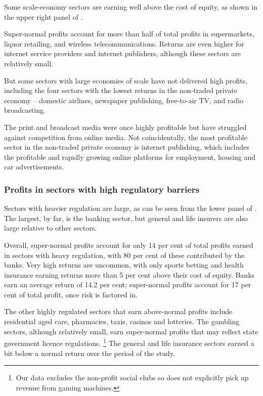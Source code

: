 Some scale-economy sectors are earning well above the cost of equity, as shown in the upper right panel of .

Super-normal profits account for more than half of total profits in supermarkets, liquor retailing, and wireless telecommunications. Returns are even higher for internet service providers and internet publishers, although these sectors are relatively small.

But some sectors with large economies of scale have not delivered high profits, including the four sectors with the lowest returns in the non-traded private economy -- domestic airlines, newspaper publishing, free-to-air TV, and radio broadcasting.

The print and broadcast media were once highly profitable but have struggled against competition from online media. Not coincidentally, the most profitable sector in the non-traded private economy is internet publishing, which includes the profitable and rapidly growing online platforms for employment, housing and car advertisements.

\subsubsection{Profits in sectors with high regulatory barriers}

Sectors with heavier regulation are large, as can be seen from the lower panel of . The largest, by far, is the banking sector, but general and life insurers are also large relative to other sectors.

Overall, super-normal profits account for only 14 per cent of total profits earned in sectors with heavy regulation, with 80 per cent of these contributed by the banks.
Very high returns are uncommon, with only sports betting and health insurance earning returns more than 5 per cent above their cost of equity.
Banks earn an average return of 14.2 per cent; super-normal profits account for 17 per cent of total profit, once risk is factored in. 

The other highly regulated sectors that earn above-normal profits include residential aged care, pharmacies, taxis, casinos and lotteries. The gambling sectors, although relatively small, earn super-normal profits that may reflect state government licence regulations.%
    \footnote{Our data excludes the non-profit social clubs so does not explicitly pick up revenue from gaming machines.}
The general and life insurance sectors earned a bit below a normal return over the period of the study. 

